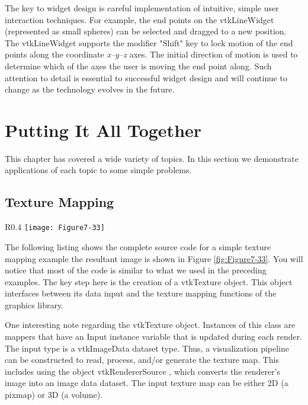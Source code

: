 The key to widget design is careful implementation of intuitive, simple user interaction techniques. For example, the end points on the vtkLineWidget (represented as small spheres) can be selected and dragged to a new position. The vtkLineWidget supports the modifier "Shift" key to lock motion of the end points along the coordinate \emph{x--y--z} axes. The initial direction of motion is used to determine which of the axes the user is moving the end point along. Such attention to detail is essential to successful widget design and will continue to change as the technology evolves in the future.

\section{Putting It All Together}

This chapter has covered a wide variety of topics. In this section we demonstrate applications of each topic to some simple problems.

\subsection{Texture Mapping}

\begin{wrapfigure}{R}{0.4\textwidth}
	\centering
	\texttt{[image: Figure7-33]}
	\caption{Example of texture mapping.(\href{https://lorensen.github.io/VTKExamples/site/Cxx/Texture/TexturePlane/}{TexturePlane.cxx}) or (\href{https://lorensen.github.io/VTKExamples/site/Python/Texture/TexturePlane/}{TexturePlane.py})}
	\label{fig:Figure7-33}
\end{wrapfigure}

The following listing shows the complete source code for a simple texture mapping example the resultant image is shown in Figure \ref{fig:Figure7-33}. You will notice that most of the code is similar to what we used in the preceding examples. The key step here is the creation of a vtkTexture object. This object interfaces between its data input and the texture mapping functions of the graphics library.

One interesting note regarding the vtkTexture object. Instances of this class are mappers that have an Input instance variable that is updated during each render. The input type is a vtkImageData dataset type. Thus, a visualization pipeline can be constructed to read, process, and/or generate the texture map. This includes using the object vtkRendererSource , which converts the renderer's image into an image data dataset. The input texture map can be either 2D (a pixmap) or 3D (a volume).

